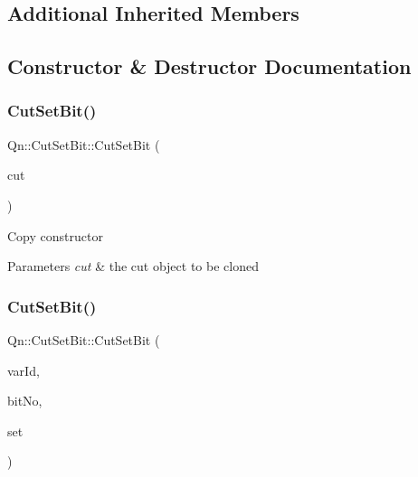 \subsection*{Additional Inherited Members}


\subsection{Constructor \& Destructor Documentation}
\mbox{\label{classQn_1_1CutSetBit_adb4e4a353d808dac2bdeeeb534600444}} 
\subsubsection{\texorpdfstring{Cut\+Set\+Bit()}{CutSetBit()}\hspace{0.1cm}{\footnotesize\ttfamily [1/2]}}
{\footnotesize\ttfamily Qn\+::\+Cut\+Set\+Bit\+::\+Cut\+Set\+Bit (\begin{DoxyParamCaption}\item[{const \mbox{\hyperlink{classQn_1_1CutSetBit}{Cut\+Set\+Bit}} \&}]{cut }\end{DoxyParamCaption})}

Copy constructor 
\begin{DoxyParams}{Parameters}
{\em cut} & the cut object to be cloned \\
\hline
\end{DoxyParams}
\mbox{\label{classQn_1_1CutSetBit_af27d1e31ca426cd6c8eba43ffcd099c1}} 
\subsubsection{\texorpdfstring{Cut\+Set\+Bit()}{CutSetBit()}\hspace{0.1cm}{\footnotesize\ttfamily [2/2]}}
{\footnotesize\ttfamily Qn\+::\+Cut\+Set\+Bit\+::\+Cut\+Set\+Bit (\begin{DoxyParamCaption}\item[{Int\+\_\+t}]{var\+Id,  }\item[{Int\+\_\+t}]{bit\+No,  }\item[{Bool\+\_\+t}]{set }\end{DoxyParamCaption})}

